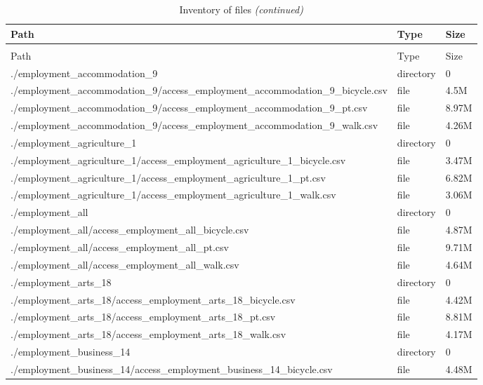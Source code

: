 \documentclass{article}
\begin{document}
\begin{longtable}[t]{>{\raggedright\arraybackslash}p{13cm}ll}
\caption{\label{tab:unnamed-chunk-6}Inventory of files}\\
\toprule
Path & Type & Size\\
\midrule
\endfirsthead
\caption[]{Inventory of files \textit{(continued)}}\\
\toprule
Path & Type & Size\\
\midrule
\endhead

\endfoot
\bottomrule
\endlastfoot
./employment\_accommodation\_9 & directory & 0\\
./employment\_accommodation\_9/access\_employment\_accommodation\_9\_bicycle.csv & file & 4.5M\\
./employment\_accommodation\_9/access\_employment\_accommodation\_9\_pt.csv & file & 8.97M\\
./employment\_accommodation\_9/access\_employment\_accommodation\_9\_walk.csv & file & 4.26M\\
./employment\_agriculture\_1 & directory & 0\\
\addlinespace
./employment\_agriculture\_1/access\_employment\_agriculture\_1\_bicycle.csv & file & 3.47M\\
./employment\_agriculture\_1/access\_employment\_agriculture\_1\_pt.csv & file & 6.82M\\
./employment\_agriculture\_1/access\_employment\_agriculture\_1\_walk.csv & file & 3.06M\\
./employment\_all & directory & 0\\
./employment\_all/access\_employment\_all\_bicycle.csv & file & 4.87M\\
\addlinespace
./employment\_all/access\_employment\_all\_pt.csv & file & 9.71M\\
./employment\_all/access\_employment\_all\_walk.csv & file & 4.64M\\
./employment\_arts\_18 & directory & 0\\
./employment\_arts\_18/access\_employment\_arts\_18\_bicycle.csv & file & 4.42M\\
./employment\_arts\_18/access\_employment\_arts\_18\_pt.csv & file & 8.81M\\
\addlinespace
./employment\_arts\_18/access\_employment\_arts\_18\_walk.csv & file & 4.17M\\
./employment\_business\_14 & directory & 0\\
./employment\_business\_14/access\_employment\_business\_14\_bicycle.csv & file & 4.48M\\

\end{longtable}
\end{document}

